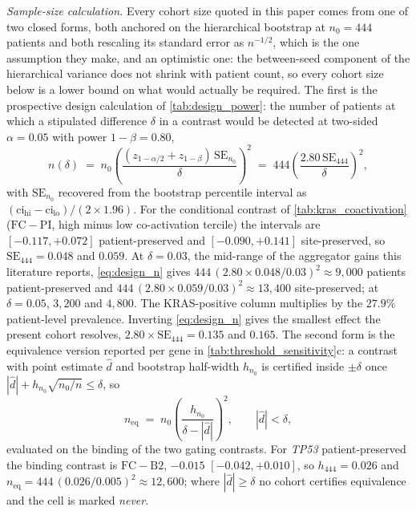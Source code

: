 \emph{Sample-size calculation.} Every cohort size quoted in this paper
comes from one of two closed forms, both anchored on the hierarchical
bootstrap at $n_0\!=\!444$ patients and both rescaling its standard error
as $n^{-1/2}$, which is the one assumption they make, and an optimistic
one: the between-seed component of the hierarchical variance does not
shrink with patient count, so every cohort size below is a lower bound
on what would actually be required. The first is the
prospective design calculation of \cref{tab:design_power}: the number of
patients at which a stipulated difference $\delta$ in a contrast would be
detected at two-sided $\alpha\!=\!0.05$ with power $1-\beta\!=\!0.80$,
\begin{equation}
n(\delta) \;=\; n_0\left(\frac{(z_{1-\alpha/2}+z_{1-\beta})\,
  \mathrm{SE}_{n_0}}{\delta}\right)^{2}
\;=\; 444\left(\frac{2.80\,\mathrm{SE}_{444}}{\delta}\right)^{2},
\label{eq:design_n}
\end{equation}
with $\mathrm{SE}_{n_0}$ recovered from the bootstrap percentile interval
as $(\mathrm{ci}_{\mathrm{hi}}-\mathrm{ci}_{\mathrm{lo}})/(2\times1.96)$.
For the conditional contrast of \cref{tab:kras_coactivation}
($\mathrm{FC}-\mathrm{PI}$, high minus low co-activation tercile) the
intervals are $[-0.117,+0.072]$ patient-preserved and $[-0.090,+0.141]$
site-preserved, so $\mathrm{SE}_{444}\!=\!0.048$ and $0.059$. At
$\delta\!=\!0.03$, the mid-range of the aggregator gains this literature
reports, \cref{eq:design_n} gives $444\,(2.80\times0.048/0.03)^2 \approx
9{,}000$ patients patient-preserved and $444\,(2.80\times0.059/0.03)^2
\approx 13{,}400$ site-preserved; at $\delta\!=\!0.05$, $3{,}200$ and
$4{,}800$. The KRAS-positive column multiplies by the $27.9\%$
patient-level prevalence. Inverting \cref{eq:design_n} gives the smallest
effect the present cohort resolves, $2.80\times\mathrm{SE}_{444}
\!=\!0.135$ and $0.165$. The second form is the equivalence version
reported per gene in \cref{tab:threshold_sensitivity}c: a contrast with
point estimate $\hat d$ and bootstrap half-width $h_{n_0}$ is certified
inside $\pm\delta$ once $|\hat d| + h_{n_0}\sqrt{n_0/n} \le \delta$, so
\begin{equation}
n_{\mathrm{eq}} \;=\; n_0\left(\frac{h_{n_0}}{\delta-|\hat d|}\right)^{2},
\qquad |\hat d|<\delta ,
\label{eq:equivalence_n}
\end{equation}
evaluated on the binding of the two gating contrasts. For \textit{TP53}
patient-preserved the binding contrast is $\mathrm{FC}-\mathrm{B2}$,
$-0.015$ $[-0.042,+0.010]$, so $h_{444}\!=\!0.026$ and
$n_{\mathrm{eq}}\!=\!444\,(0.026/0.005)^2\approx12{,}600$; where
$|\hat d|\ge\delta$ no cohort certifies equivalence and the cell is marked
\emph{never}.

